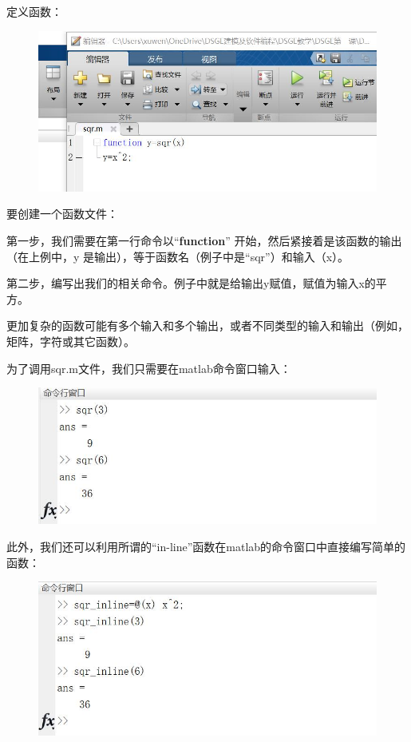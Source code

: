 \documentclass[cn,10pt,math=newtx,citestyle=gb7714-2015,bibstyle=gb7714-2015]{elegantbook}
\begin{document}
{{	定义函数：
	\begin{figure}[htbp!]
		\centering
		\includegraphics[width=0.8\linewidth]{FIG/function1}
		\centering
	\end{figure}
	
	要创建一个函数文件：
	
	第一步，我们需要在第一行命令以“\textbf{function}” 开始，然后紧接着是该函数的输出（在上例中，y 是输出），等于函数名（例子中是“sqr”）和输入（x）。
	
	第二步，编写出我们的相关命令。例子中就是给输出y赋值，赋值为输入x的平方。
	
	更加复杂的函数可能有多个输入和多个输出，或者不同类型的输入和输出（例如，矩阵，字符或其它函数）。
	
	为了调用sqr.m文件，我们只需要在matlab命令窗口输入：
	
	\begin{figure}[htbp!]
		\centering
		\includegraphics[width=0.8\linewidth]{FIG/sqr}
		\centering
	\end{figure}
	
	此外，我们还可以利用所谓的“in-line”函数在matlab的命令窗口中直接编写简单的函数：
	\begin{figure}[htbp!]
		\centering
		\includegraphics[width=0.8\linewidth]{FIG/inlinefunction}
		\centering
	\end{figure}
	
}}
\end{document}
